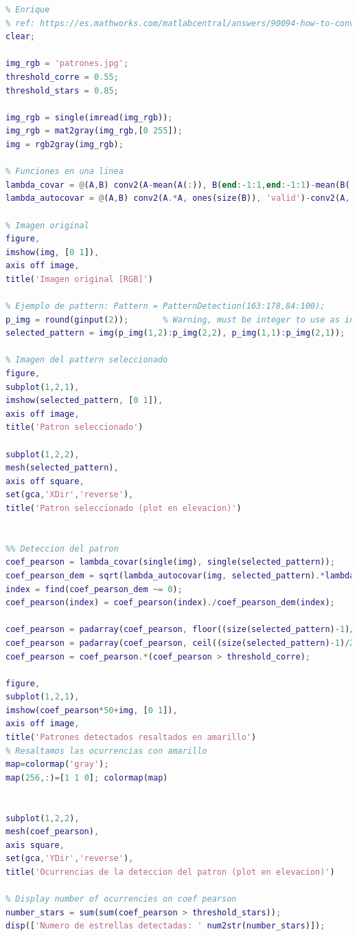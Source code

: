 \documentclass[12pt]{article}
\begin{document}
	\begin{lstlisting}[language=Matlab, caption={Implementación detección de patrones en \texttt{MATLAB}}]
% 7 - Patrones
% Enrique
% ref: https://es.mathworks.com/matlabcentral/answers/90094-how-to-convolved-two-image
clear;

img_rgb = 'patrones.jpg';
threshold_corre = 0.55;
threshold_stars = 0.85;

img_rgb = single(imread(img_rgb));
img_rgb = mat2gray(img_rgb,[0 255]);
img = rgb2gray(img_rgb);

% Funciones en una linea
lambda_covar = @(A,B) conv2(A-mean(A(:)), B(end:-1:1,end:-1:1)-mean(B(:)), 'valid');
lambda_autocovar = @(A,B) conv2(A.*A, ones(size(B)), 'valid')-conv2(A, ones(size(B)), 'valid').^2/numel(B);

% Imagen original
figure,
imshow(img, [0 1]), 
axis off image,
title('Imagen original [RGB]')

% Ejemplo de pattern: Pattern = PatternDetection(163:178,84:100);
p_img = round(ginput(2));       % Warning, must be integer to use as index
selected_pattern = img(p_img(1,2):p_img(2,2), p_img(1,1):p_img(2,1));

% Imagen del pattern seleccionado
figure,
subplot(1,2,1), 
imshow(selected_pattern, [0 1]), 
axis off image,
title('Patron seleccionado')

subplot(1,2,2), 
mesh(selected_pattern), 
axis off square, 
set(gca,'XDir','reverse'), 
title('Patron seleccionado (plot en elevacion)')


%% Deteccion del patron
coef_pearson = lambda_covar(single(img), single(selected_pattern));
coef_pearson_dem = sqrt(lambda_autocovar(img, selected_pattern).*lambda_autocovar(selected_pattern, selected_pattern));
index = find(coef_pearson_dem ~= 0);
coef_pearson(index) = coef_pearson(index)./coef_pearson_dem(index);

coef_pearson = padarray(coef_pearson, floor((size(selected_pattern)-1)/2), 0, 'post');
coef_pearson = padarray(coef_pearson, ceil((size(selected_pattern)-1)/2), 0, 'pre');
coef_pearson = coef_pearson.*(coef_pearson > threshold_corre);

figure,
subplot(1,2,1), 
imshow(coef_pearson*50+img, [0 1]),
axis off image, 
title('Patrones detectados resaltados en amarillo')
% Resaltamos las ocurrencias con amarillo
map=colormap('gray'); 
map(256,:)=[1 1 0]; colormap(map)


subplot(1,2,2), 
mesh(coef_pearson), 
axis square, 
set(gca,'YDir','reverse'), 
title('Ocurrencias de la deteccion del patron (plot en elevacion)')

% Display number of ocurrencies on coef pearson
number_stars = sum(sum(coef_pearson > threshold_stars));
disp(['Numero de estrellas detectadas: ' num2str(number_stars)]);
	\end{lstlisting}
\end{document}
